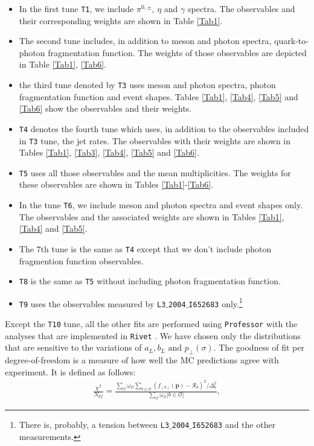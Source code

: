 \documentclass[aps,preprint,floatfix,nofootinbib,showpacs]{revtex4-1}
\begin{document}
\begin{itemize}
 \item In the first tune \texttt{T1}, we include $\pi^{0,\pm}$, $\eta$
 and $\gamma$ spectra. The observables and their corresponding weights are
 shown in Table \ref{Tab1}.
 \item The second tune includes, in addition to meson and photon spectra,
 quark-to-photon fragmentation function. The weights of those observables 
 are depicted in Table \ref{Tab1}, \ref{Tab6}.
 \item the third tune denoted by \texttt{T3} uses meson and photon spectra,
 photon fragmentation function and event shapes. Tables \ref{Tab1}, \ref{Tab4}, \ref{Tab5} and
 \ref{Tab6} show the observables and their weights.
 \item \texttt{T4} denotes the fourth tune which uses, in addition to the observables
 included in \texttt{T3} tune, the jet rates.
 The observables with their weights are shown in Tables \ref{Tab1}, \ref{Tab3},
 \ref{Tab4}, \ref{Tab5} and \ref{Tab6}.
 \item \texttt{T5} uses all those observables and the mean multiplicities. The weights
 for these observables are shown in Tables \ref{Tab1}-\ref{Tab6}.
 \item In the tune \texttt{T6}, we include meson and photon spectra and event shapes only.
The observables and the associated weights are shown in Tables \ref{Tab1}, \ref{Tab4} and \ref{Tab5}.
 \item The $7\text{th}$ tune is the same as \texttt{T4} except that we don't include 
photon fragmention function observables.
 \item \texttt{T8} is the same as \texttt{T5} without including photon fragmentation 
 function.
 \item \texttt{T9} uses the observables 
 measured by \texttt{L3$\_$2004$\_$I652683} \cite{Achard:2004sv} only.\footnote{There is, probably, 
 a tension between \texttt{L3$\_$2004$\_$I652683} and the other measurements.} 
 \end{itemize}
Except the \texttt{T10} tune, all the other fits 
are performed using \texttt{Professor} \cite{Buckley:2009bj} with 
the analyses that are implemented in \texttt{Rivet} \cite{Buckley:2010ar}. 
We have chosen only the distributions that are sensitive to the variations 
of $a_L, b_L \text{ and } p_\perp(\sigma)$. The goodness of fit per 
degree-of-freedom is a measure of how well the MC predictions agree
with experiment. It is defined as follows:
\begin{eqnarray}
 \frac{\chi^2}{N_{df}} = \frac{\sum_{\mathcal{O}} 
 \omega_\mathcal{O} \sum_{b\in \mathcal{O}} (f_{(b)}(\textbf{p}) - \mathcal{R}_b)^2/\Delta_b^2}{\sum_{\mathcal{O}} \omega_\mathcal{O} |b \in \mathcal{O}|},
\label{Gof-Ndf}
 \end{eqnarray}
\end{document}
